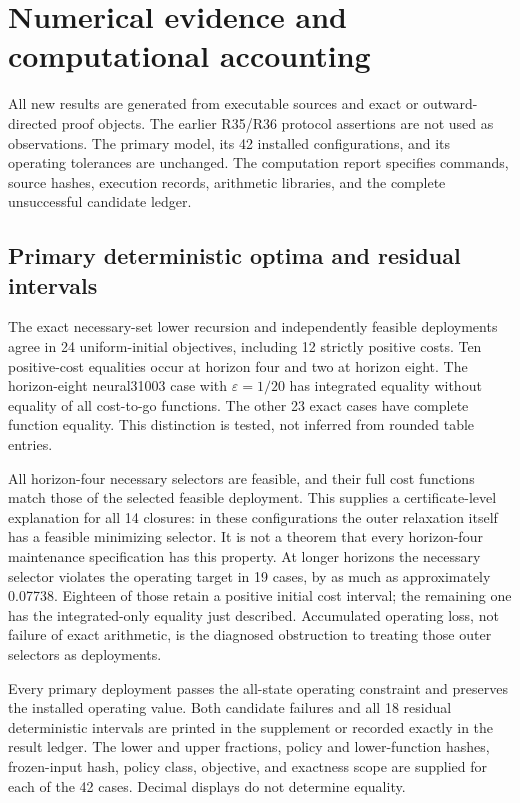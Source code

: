 \section{Numerical evidence and computational accounting}\label{sec:results}
All new results are generated from executable sources and exact or outward-directed proof objects. The earlier R35/R36 protocol assertions are not used as observations. The primary model, its 42 installed configurations, and its operating tolerances are unchanged. The computation report specifies commands, source hashes, execution records, arithmetic libraries, and the complete unsuccessful candidate ledger.

\subsection{Primary deterministic optima and residual intervals}

The exact necessary-set lower recursion and independently feasible deployments agree in 24 uniform-initial objectives, including 12 strictly positive costs. Ten positive-cost equalities occur at horizon four and two at horizon eight. The horizon-eight neural31003 case with $\varepsilon=1/20$ has integrated equality without equality of all cost-to-go functions. The other 23 exact cases have complete function equality. This distinction is tested, not inferred from rounded table entries.

All horizon-four necessary selectors are feasible, and their full cost functions match those of the selected feasible deployment. This supplies a certificate-level explanation for all 14 closures: in these configurations the outer relaxation itself has a feasible minimizing selector. It is not a theorem that every horizon-four maintenance specification has this property. At longer horizons the necessary selector violates the operating target in 19 cases, by as much as approximately 0.07738. Eighteen of those retain a positive initial cost interval; the remaining one has the integrated-only equality just described. Accumulated operating loss, not failure of exact arithmetic, is the diagnosed obstruction to treating those outer selectors as deployments.

Every primary deployment passes the all-state operating constraint and preserves the installed operating value. Both candidate failures and all 18 residual deterministic intervals are printed in the supplement or recorded exactly in the result ledger. The lower and upper fractions, policy and lower-function hashes, frozen-input hash, policy class, objective, and exactness scope are supplied for each of the 42 cases. Decimal displays do not determine equality.

